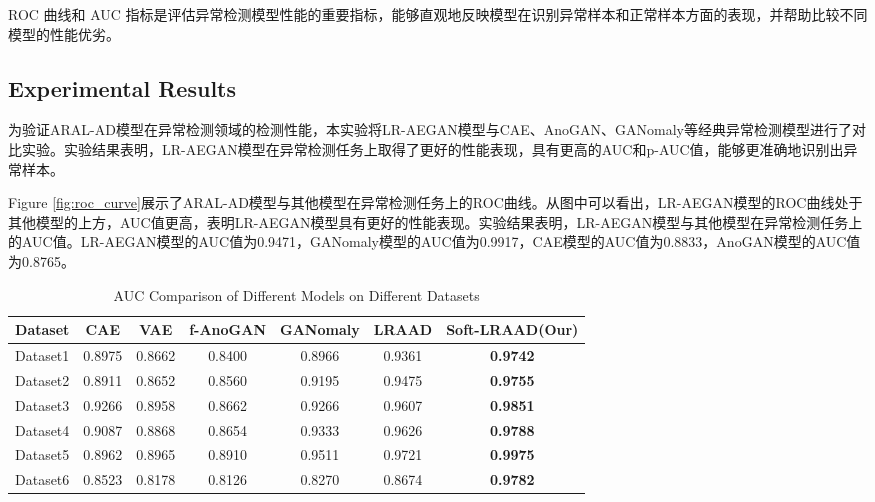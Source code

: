 \documentclass{article}
\begin{document}
ROC 曲线和 AUC 指标是评估异常检测模型性能的重要指标，能够直观地反映模型在识别异常样本和正常样本方面的表现，并帮助比较不同模型的性能优劣。

\subsection{Experimental Results}
为验证ARAL-AD模型在异常检测领域的检测性能，本实验将LR-AEGAN模型与CAE、AnoGAN、GANomaly等经典异常检测模型进行了对比实验。实验结果表明，LR-AEGAN模型在异常检测任务上取得了更好的性能表现，具有更高的AUC和p-AUC值，能够更准确地识别出异常样本。

Figure \ref{fig:roc_curve}展示了ARAL-AD模型与其他模型在异常检测任务上的ROC曲线。从图中可以看出，LR-AEGAN模型的ROC曲线处于其他模型的上方，AUC值更高，表明LR-AEGAN模型具有更好的性能表现。实验结果表明，LR-AEGAN模型与其他模型在异常检测任务上的AUC值。LR-AEGAN模型的AUC值为0.9471，GANomaly模型的AUC值为0.9917，CAE模型的AUC值为0.8833，AnoGAN模型的AUC值为0.8765。


\begin{table}[H]
    \centering
    \caption{AUC Comparison of Different Models on Different Datasets}
    \begin{tabular}{ccccccc}
        \toprule
        Dataset & CAE & VAE & f-AnoGAN & GANomaly & LRAAD & Soft-LRAAD(Our) \\
        \midrule
        Dataset1 & 0.8975 & 0.8662 & 0.8400 & 0.8966 & 0.9361 & \textbf{0.9742} \\
        Dataset2 & 0.8911 & 0.8652 & 0.8560 & 0.9195 & 0.9475 & \textbf{0.9755} \\
        Dataset3 & 0.9266 & 0.8958 & 0.8662 & 0.9266 & 0.9607 & \textbf{0.9851} \\
        Dataset4 & 0.9087 & 0.8868 & 0.8654 & 0.9333 & 0.9626 & \textbf{0.9788} \\
        Dataset5 & 0.8962 & 0.8965 & 0.8910 & 0.9511 & 0.9721 & \textbf{0.9975} \\
        Dataset6 & 0.8523 & 0.8178 & 0.8126 & 0.8270 & 0.8674 & \textbf{0.9782} \\
        \bottomrule
    \end{tabular}
    \label{tab:auc}
\end{table}
\end{document}
